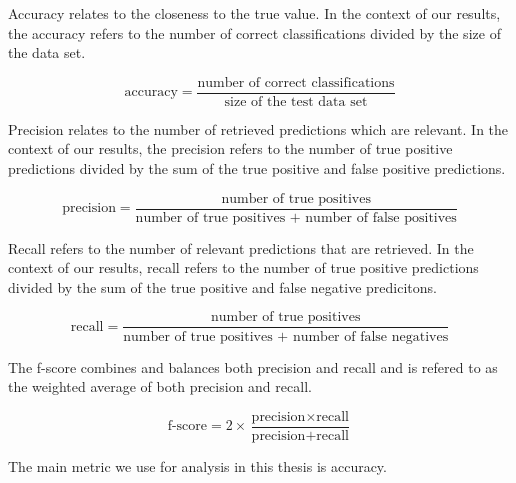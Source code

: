 Accuracy relates to the closeness to the true value. In the context of our results, the accuracy refers to the number of correct classifications 
divided by the size of the data set.

\[ \text{accuracy} = \frac{\text{number of correct classifications}}{\text{size of the test data set}}\]

Precision relates to the number of retrieved predictions which are relevant. In the context of our results, the precision refers to the number of true positive predictions 
divided by the sum of the true positive and false positive predictions.

\[ \text{precision} = \frac{\text{number of true positives}}{\text{number of true positives + number of false positives}}\]

Recall refers to the number of relevant predictions that are retrieved. In the context of our results, recall refers to the number of true positive predictions 
divided by the sum of the true positive and false negative predicitons.

\[ \text{recall} = \frac{\text{number of true positives}}{\text{number of true positives + number of false negatives}}\]

The f-score combines and balances both precision and recall and is refered to as the weighted average of both precision and recall. 

\[ \text{f-score} = 2 \times \frac{\text{precision} \times \text{recall}}{\text{precision} + \text{recall}}\]

The main metric we use for analysis in this thesis is accuracy.

